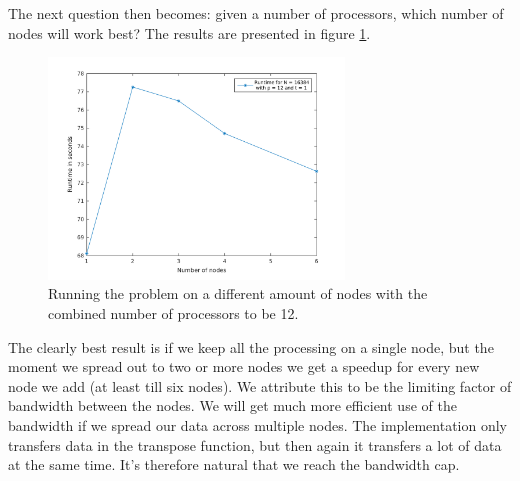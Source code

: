 The next question then becomes: given a number of processors, which number of nodes will work best? The results are presented in figure \ref{fig:bestnodes}.
\begin{figure}[h]
\centering
\includegraphics[width=0.7\textwidth]{./figures/bestnodes}
\caption{Running the problem on a different amount of nodes with the combined number of processors to be 12.}
\label{fig:bestnodes}
\end{figure}
The clearly best result is if we keep all the processing on a single node, but the moment we spread out to two or more nodes we get a speedup for every new node we add (at least till six nodes). We attribute this to be the limiting factor of bandwidth between the nodes. We will get much more efficient use of the bandwidth if we spread our data across multiple nodes. The implementation only transfers data in the transpose function, but then again it transfers a lot of data at the same time. It's therefore natural that we reach the bandwidth cap.


